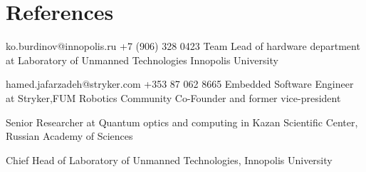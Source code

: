 \section{References}
    {ko.burdinov@innopolis.ru
    \hspace{7mm} +7 (906) 328 0423 }
    {Team Lead of hardware department at Laboratory of Unmanned Technologies
    Innopolis University
    }

    {hamed.jafarzadeh@stryker.com 
    \hspace{7mm} +353 87 062 8665}
    {Embedded Software Engineer at Stryker,FUM Robotics Community Co-Founder and former vice-president }

    {
     Senior Researcher at Quantum optics and computing  in  Kazan Scientific Center, Russian Academy of Sciences
    }
    
    {Chief Head of Laboratory of Unmanned Technologies,
    Innopolis University
    }